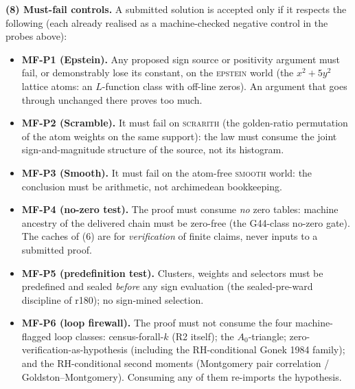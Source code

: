 \par\smallskip\noindent\textbf{(8) Must-fail controls.}  A submitted solution is accepted only
if it respects the following (each already realised as a machine-checked negative control in
the probes above):
\begin{itemize}
\item \textbf{MF-P1 (Epstein).}  Any proposed sign source or positivity argument must fail, or
  demonstrably lose its constant, on the \textsc{epstein} world (the $x^2 + 5y^2$ lattice
  atoms: an $L$-function class with off-line zeros).  An argument that goes through unchanged
  there proves too much.
\item \textbf{MF-P2 (Scramble).}  It must fail on \textsc{scrarith} (the golden-ratio
  permutation of the atom weights on the same support): the law must consume the joint
  sign-and-magnitude structure of the source, not its histogram.
\item \textbf{MF-P3 (Smooth).}  It must fail on the atom-free \textsc{smooth} world: the
  conclusion must be arithmetic, not archimedean bookkeeping.
\item \textbf{MF-P4 (no-zero test).}  The proof must consume \emph{no} zero tables: machine
  ancestry of the delivered chain must be zero-free (the G44-class no-zero gate).  The caches
  of (6) are for \emph{verification} of finite claims, never inputs to a submitted proof.
\item \textbf{MF-P5 (predefinition test).}  Clusters, weights and selectors must be predefined
  and sealed \emph{before} any sign evaluation (the sealed-pre-ward discipline of r180); no
  sign-mined selection.
\item \textbf{MF-P6 (loop firewall).}  The proof must not consume the four machine-flagged
  loop classes: census-forall-$k$ (R2 itself); the $A_0$-triangle; zero-verification-as-hypothesis
  (including the RH-conditional Gonek 1984 family); and the RH-conditional second moments
  (Montgomery pair correlation / Goldston--Montgomery).  Consuming any of them re-imports the
  hypothesis.
\end{itemize}


